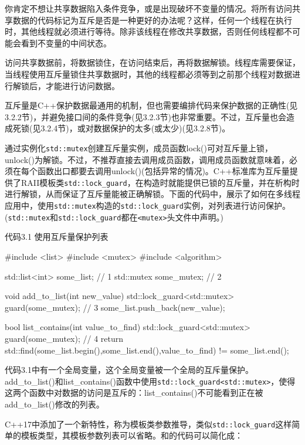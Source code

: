 
你肯定不想让共享数据陷入条件竞争，或是出现破坏不变量的情况。将所有访问共享数据的代码标记为互斥是否是一种更好的办法呢？这样，任何一个线程在执行时，其他线程就必须进行等待。除非该线程在修改共享数据，否则任何线程都不可能会看到不变量的中间状态。

访问共享数据前，将数据锁住，在访问结束后，再将数据解锁。线程库需要保证，当线程使用互斥量锁住共享数据时，其他的线程都必须等到之前那个线程对数据进行解锁后，才能进行访问数据。

互斥量是C++保护数据最通用的机制，但也需要编排代码来保护数据的正确性(见3.2.2节)，并避免接口间的条件竞争(见3.2.3节)也非常重要。不过，互斥量也会造成死锁(见3.2.4节)，或对数据保护的太多(或太少)(见3.2.8节)。


通过实例化\texttt{std::mutex}创建互斥量实例，成员函数lock()可对互斥量上锁，unlock()为解锁。不过，不推荐直接去调用成员函数，调用成员函数就意味着，必须在每个函数出口都要去调用unlock()(包括异常的情况)。C++标准库为互斥量提供了RAII模板类\texttt{std::lock\_guard}，在构造时就能提供已锁的互斥量，并在析构时进行解锁，从而保证了互斥量能被正确解锁。下面的代码中，展示了如何在多线程应用中，使用\texttt{std::mutex}构造的\texttt{std::lock\_guard}实例，对列表进行访问保护。(\texttt{std::mutex}和\texttt{std::lock\_guard}都在\texttt{<mutex>}头文件中声明。)

代码3.1 使用互斥量保护列表

\begin{cpp}
#include <list>
#include <mutex>
#include <algorithm>

std::list<int> some_list;    // 1
std::mutex some_mutex;    // 2

void add_to_list(int new_value)
{
  std::lock_guard<std::mutex> guard(some_mutex);    // 3
  some_list.push_back(new_value);
}

bool list_contains(int value_to_find)
{
  std::lock_guard<std::mutex> guard(some_mutex);    // 4
  return std::find(some_list.begin(),some_list.end(),value_to_find) != some_list.end();
}
\end{cpp}

代码3.1中有一个全局变量，这个全局变量被一个全局的互斥量保护。add\_to\_list()和list\_contains()函数中使用\texttt{std::lock\_guard<std::mutex>}，使得这两个函数中对数据的访问是互斥的：list\_contains()不可能看到正在被add\_to\_list()修改的列表。

C++17中添加了一个新特性，称为模板类参数推导，类似\texttt{std::lock\_guard}这样简单的模板类型，其模板参数列表可以省略。和的代码可以简化成：

